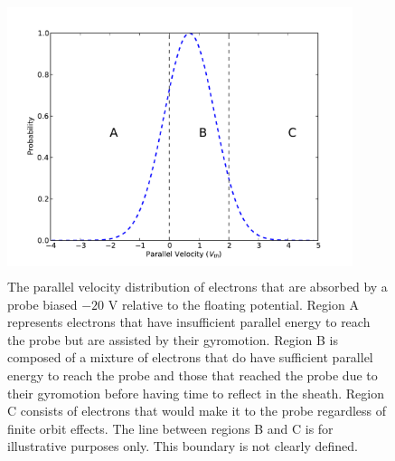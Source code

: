 \begin{figure}[]
	\centering
	\includegraphics[width=0.9\textwidth , height = 8cm]{absorbed_distribution.pdf}
	\caption{The parallel velocity distribution of electrons that are absorbed by a probe biased $-20$ V relative to the floating potential. Region A represents electrons that have insufficient parallel energy to reach the probe but are assisted by their gyromotion. Region B is composed of a mixture of electrons that do have sufficient parallel energy to reach the probe and those that reached the probe due to their gyromotion before having time to reflect in the sheath. Region C consists of electrons that would make it to the probe regardless of finite orbit effects. The line between regions B and C is for illustrative purposes only. This boundary is not clearly defined.  }
	\label{fig:absorbed_distribution}
\end{figure}
